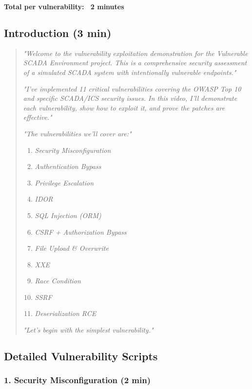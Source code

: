 \documentclass[12pt,a4paper]{article}
\begin{document}
\textbf{Total per vulnerability: ~2 minutes}

\subsection{Introduction (3 min)}

\begin{quote}
\textit{"Welcome to the vulnerability exploitation demonstration for the Vulnerable SCADA Environment project. This is a comprehensive security assessment of a simulated SCADA system with intentionally vulnerable endpoints."}

\textit{"I've implemented 11 critical vulnerabilities covering the OWASP Top 10 and specific SCADA/ICS security issues. In this video, I'll demonstrate each vulnerability, show how to exploit it, and prove the patches are effective."}

\textit{"The vulnerabilities we'll cover are:"}
\begin{enumerate}
    \item \textit{Security Misconfiguration}
    \item \textit{Authentication Bypass}
    \item \textit{Privilege Escalation}
    \item \textit{IDOR}
    \item \textit{SQL Injection (ORM)}
    \item \textit{CSRF + Authorization Bypass}
    \item \textit{File Upload \& Overwrite}
    \item \textit{XXE}
    \item \textit{Race Condition}
    \item \textit{SSRF}
    \item \textit{Deserialization RCE}
\end{enumerate}

\textit{"Let's begin with the simplest vulnerability."}
\end{quote}

\newpage
\subsection{Detailed Vulnerability Scripts}

\subsubsection{1. Security Misconfiguration (2 min)}
\end{document}

